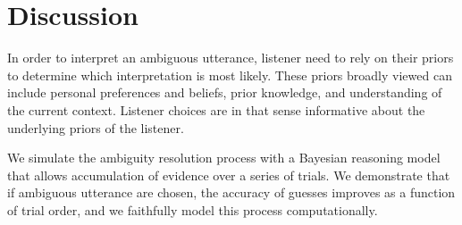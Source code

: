 \documentclass[10pt,a4paper]{article}
\begin{document}
\section{Discussion}

In order to interpret an ambiguous utterance, listener need to rely on their priors to determine which interpretation is most likely. These priors broadly viewed can include personal preferences and beliefs, prior knowledge, and understanding of the current context. Listener choices are in that sense informative about the underlying priors of the listener. 

We simulate the ambiguity resolution process with a Bayesian reasoning model that allows accumulation of evidence over a series of trials. We demonstrate that if ambiguous utterance are chosen, the accuracy of guesses improves as a function of trial order, and we faithfully model this process computationally.


%
%


\setlength{\bibleftmargin}{.125in}
\setlength{\bibindent}{-\bibleftmargin}


\end{document}
